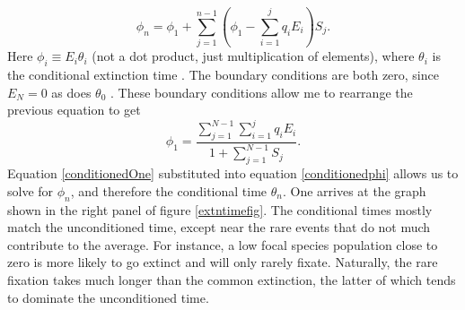 \begin{equation}
\phi_n = \phi_1 + \sum_{j=1}^{n-1}\left(\phi_1 - \sum_{i=1}^{j}q_iE_i\right)S_{j}.  %
\end{equation} \label{conditionedphi}
Here $\phi_i \equiv E_i \theta_i$ (not a dot product, just multiplication of elements), where $\theta_i$ is the conditional extinction time \cite{Iyer-Biswas2015}. %
The boundary conditions are both zero, since $E_N=0$ as does $\theta_0$ \cite{Nisbet1982}. 
These boundary conditions allow me to rearrange the previous equation to get
\begin{equation}
\phi_1 = \frac{\sum_{j=1}^{N-1}\sum_{i=1}^{j}q_iE_i}{1+\sum_{j=1}^{N-1}S_j}. 
\end{equation} \label{conditionedOne}
Equation \ref{conditionedOne} substituted into equation \ref{conditionedphi} allows us to solve for $\phi_n$, and therefore the conditional time $\theta_n$. %
One arrives at the graph shown in the right panel of figure \ref{extntimefig}. 
The conditional times mostly match the unconditioned time, except near the rare events that do not much contribute to the average. 
For instance, a low focal species population close to zero is more likely to go extinct and will only rarely fixate. Naturally, the rare fixation takes much longer than the common extinction, the latter of which tends to dominate the unconditioned time. 



